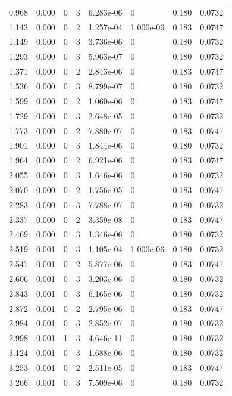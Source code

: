 \documentclass[preview]{standalone}
\begin{document}
{{\begin{tabular}{L{1.2cm}C{1.2cm} C{0.3cm}C{0.5cm} C{1.4cm}C{1.4cm} C{1.4cm}C{1.4cm}}
  0.968  &  0.000  & 0     &  3 &  6.283e-06  & 0  & 0.180 &  0.0732   \\ 
  1.143  &  0.000  & 0     &  2 &  1.257e-04  & 1.000e-06  & 0.183 &  0.0747   \\ 
  1.149  &  0.000  & 0     &  3 &  3.736e-06  & 0  & 0.180 &  0.0732   \\ 
  1.293  &  0.000  & 0     &  3 &  5.963e-07  & 0  & 0.180 &  0.0732   \\ 
  1.371  &  0.000  & 0     &  2 &  2.843e-06  & 0  & 0.183 &  0.0747   \\ 
  1.536  &  0.000  & 0     &  3 &  8.799e-07  & 0  & 0.180 &  0.0732   \\ 
  1.599  &  0.000  & 0     &  2 &  1.060e-06  & 0  & 0.183 &  0.0747   \\ 
  1.729  &  0.000  & 0     &  3 &  2.648e-05  & 0  & 0.180 &  0.0732   \\ 
  1.773  &  0.000  & 0     &  2 &  7.880e-07  & 0  & 0.183 &  0.0747   \\ 
  1.901  &  0.000  & 0     &  3 &  1.844e-06  & 0  & 0.180 &  0.0732   \\ 
  1.964  &  0.000  & 0     &  2 &  6.921e-06  & 0  & 0.183 &  0.0747   \\ 
  2.055  &  0.000  & 0     &  3 &  1.646e-06  & 0  & 0.180 &  0.0732   \\ 
  2.070  &  0.000  & 0     &  2 &  1.756e-05  & 0  & 0.183 &  0.0747   \\ 
  2.283  &  0.000  & 0     &  3 &  7.788e-07  & 0  & 0.180 &  0.0732   \\ 
  2.337  &  0.000  & 0     &  2 &  3.359e-08  & 0  & 0.183 &  0.0747   \\ 
  2.469  &  0.000  & 0     &  3 &  1.346e-06  & 0  & 0.180 &  0.0732   \\ 
  2.519  &  0.001  & 0     &  3 &  1.105e-04  & 1.000e-06  & 0.180 &  0.0732   \\ 
  2.547  &  0.001  & 0     &  2 &  5.877e-06  & 0  & 0.183 &  0.0747   \\ 
  2.606  &  0.001  & 0     &  3 &  3.203e-06  & 0  & 0.180 &  0.0732   \\ 
  2.843  &  0.001  & 0     &  3 &  6.165e-06  & 0  & 0.180 &  0.0732   \\ 
  2.872  &  0.001  & 0     &  2 &  2.795e-06  & 0  & 0.183 &  0.0747   \\ 
  2.984  &  0.001  & 0     &  3 &  2.852e-07  & 0  & 0.180 &  0.0732   \\ 
  2.998  &  0.001  & 1     &  3 &  4.646e-11  & 0  & 0.180 &  0.0732   \\ 
  3.124  &  0.001  & 0     &  3 &  1.688e-06  & 0  & 0.180 &  0.0732   \\ 
  3.253  &  0.001  & 0     &  2 &  2.511e-05  & 0  & 0.183 &  0.0747   \\ 
  3.266  &  0.001  & 0     &  3 &  7.509e-06  & 0  & 0.180 &  0.0732   \\ 
\hline 
\end{tabular} 

}}
\end{document}
